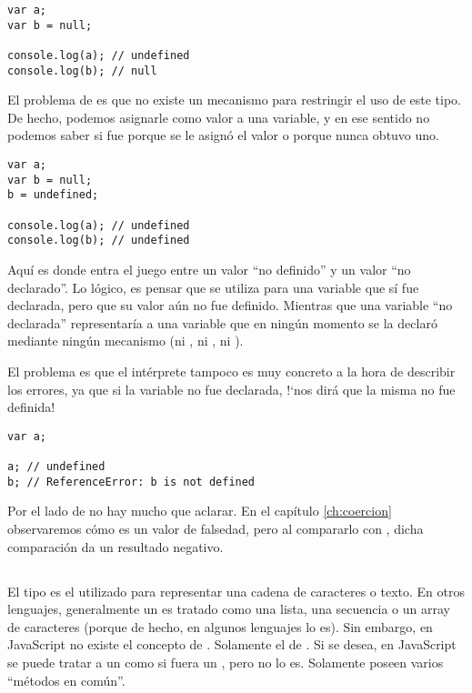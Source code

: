 \begin{lstlisting}[title={\code{null} y \code{undefined}}]
var a;
var b = null;

console.log(a);	// undefined
console.log(b);	// null
\end{lstlisting}

El problema de  es que no existe un mecanismo para restringir el uso de este tipo. De hecho, podemos asignarle  como valor a una variable, y en ese sentido no podemos saber si fue porque se le asignó el valor o porque nunca obtuvo uno.

\begin{lstlisting}
var a;
var b = null;
b = undefined;

console.log(a);	// undefined
console.log(b);	// undefined
\end{lstlisting}

Aquí es donde entra el juego entre un valor "`no definido"' y un valor "`no declarado"'. Lo lógico, es pensar que  se utiliza para una variable que sí fue declarada, pero que su valor aún no fue definido. Mientras que una variable "`no declarada"' representaría a una variable que en ningún momento se la declaró mediante ningún mecanismo (ni , ni , ni ).

El problema es que el intérprete tampoco es muy concreto a la hora de describir los errores, ya que si la variable no fue declarada, !`nos dirá que la misma no fue definida!

\begin{lstlisting}
var a;

a; // undefined
b; // ReferenceError: b is not defined
\end{lstlisting}

Por el lado de  no hay mucho que aclarar. En el capítulo \ref{ch:coercion} observaremos cómo  es un valor de falsedad, pero al compararlo con , dicha comparación da un resultado negativo.

\subsection{}

El tipo  es el utilizado para representar una cadena de caracteres o texto. En otros lenguajes, generalmente un  es tratado como una lista, una secuencia o un array de caracteres (porque de hecho, en algunos lenguajes lo es). Sin embargo, en JavaScript no existe el concepto de . Solamente el de . Si se desea, en JavaScript se puede tratar a un  como si fuera un , pero no lo es. Solamente poseen varios "`métodos en común"'.

